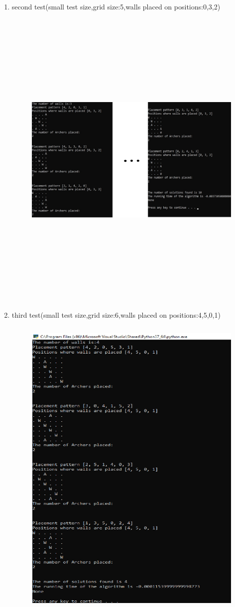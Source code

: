\documentclass{article}
\begin{document}
\begin{enumerate}
\item second test(small test size,grid size:5,walls placed on positions:0,3,2)
\begin{figure}[h]
\includegraphics[width=12 cm, height=15cm]{test2}
\end{figure}
\newpage
\item third test(small test size,grid size:6,walls placed on positions:4,5,0,1)
\begin{figure}[h]
\includegraphics[width=12 cm, height=15cm]{test3}
\end{figure}


\end{enumerate}
\end{document}
